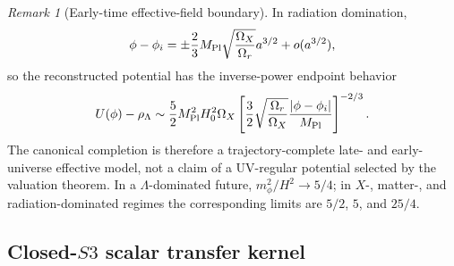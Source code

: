 \documentclass[11pt,a4paper]{article}
\def\Sthree{S3}%
\numberwithin{equation}{section}
\theoremstyle{definition}
\theoremstyle{plain}
\theoremstyle{remark}
\newtheorem{remark}[criterion]{Remark}
\newcommand{\Sthree}{S^3}
\begin{document}
\begin{remark}[Early-time effective-field boundary]
In radiation domination,
\begin{equation}
\phi-\phi_i=
\pm\frac23M_{\rm Pl}\sqrt{\frac{\Omega_X}{\Omega_r}}a^{3/2}+o(a^{3/2}),
\end{equation}
so the reconstructed potential has the inverse-power endpoint behavior
\begin{equation}
U(\phi)-\rho_\Lambda\sim
\frac52M_{\rm Pl}^2H_0^2\Omega_X
\left[
\frac32\sqrt{\frac{\Omega_r}{\Omega_X}}
\frac{|\phi-\phi_i|}{M_{\rm Pl}}
\right]^{-2/3}.
\end{equation}
The canonical completion is therefore a trajectory-complete late- and
early-universe effective model, not a claim of a UV-regular potential selected
by the valuation theorem.  In a $\Lambda$-dominated future,
$m_\phi^2/H^2\to5/4$; in $X$-, matter-, and radiation-dominated regimes the
corresponding limits are $5/2$, $5$, and $25/4$.
\end{remark}

\subsection{\texorpdfstring{Closed-\(\Sthree\) scalar transfer kernel}{Closed-S3 scalar transfer kernel}}
\end{document}

